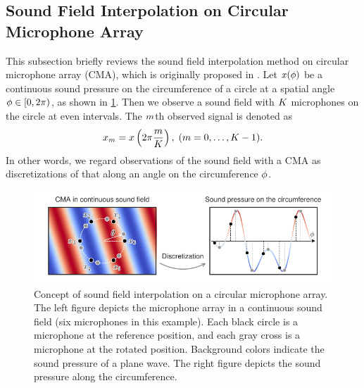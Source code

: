 \documentclass[sip,biber]{now-journal}
\begin{document}
\subsection{Sound Field Interpolation on Circular Microphone Array}
This subsection briefly reviews the sound field interpolation method on circular microphone array (CMA), which is originally proposed in \cite{Wakabayashi:2021:ICASSP}.
Let $x (\phi)$ be a continuous sound pressure on the circumference of a circle at a spatial angle $\rotCoor \in \interval[open right,soft open fences]{0}{2\pi}$, as shown in \cref{fig:sfi}.
Then we observe a sound field with $K$ microphones on the circle at even intervals.
The $m$th observed signal is denoted as
\begin{equation}
  \sfcma _{\mic} = \sfcma \left(2\pi \frac{\mic}{\Mic}\right),\; (\mic = 0, \dots, \Mic - 1).%
  \label{eq:sfi:model}
\end{equation}
In other words, we regard observations of the sound field with a CMA as discretizations of that along an angle on the circumference $\phi$.
\begin{figure}[t]
  \includegraphics{figures/diagrams/sfi.pdf}
  \caption{%
    Concept of sound field interpolation on a circular microphone array.
    The left figure depicts the microphone array in a continuous sound field (six microphones in this example).
    Each black circle is a microphone at the reference position, and each gray cross is a microphone at the rotated position.
    Background colors indicate the sound pressure of a plane wave.
    The right figure depicts the sound pressure along the circumference.
  }%
  \label{fig:sfi}
\end{figure}
\end{document}

